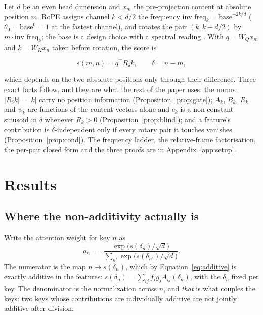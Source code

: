 \documentclass{article}
\theoremstyle{plain}
\theoremstyle{remark}
\newcommand{\R}{R}
\newcommand{\invf}{\mathrm{inv\_freq}}
\newcommand{\psik}{\psi_k}
\newcommand{\half}{d/2}
\begin{document}
Let $d$ be an even head dimension and $x_m$ the pre-projection content at
absolute position $m$. RoPE assigns channel $k < \half$ the frequency
$\invf_k = \mathrm{base}^{-2k/d}$ ($\theta_0 = \mathrm{base}^{0} = 1$ at the
fastest channel), and rotates the pair $(k, k + \half)$ by $m\cdot\invf_k$; the
base is a design choice with a spectral reading \citep{liu2026oscillator}. With
$q = W_Q x_m$ and $k = W_K x_n$ taken before rotation, the score is

\begin{equation}
  s(m,n) = q^{\!\top}\R_{\delta} k, \qquad \delta = n - m,
  \label{eq:relative}
\end{equation}

which depends on the two absolute positions only through their difference.
Three exact facts follow, and they are what the rest of the paper uses: the
norms $|\R_\delta k| = |k|$ carry no position information
(Proposition~\ref{prop:gate}); $A_k$, $B_k$, $R_k$ and $\psik$ are functions of
the content vectors alone and $c_k$ is a non-constant sinusoid in $\delta$
whenever $R_k > 0$ (Proposition~\ref{prop:blind}); and a feature's contribution
is $\delta$-independent only if every rotary pair it touches vanishes
(Proposition~\ref{prop:cond}). The frequency ladder, the relative-frame
factorisation, the per-pair closed form and the three proofs are in
Appendix~\ref{app:setup}.

\section{Results}

\subsection{Where the non-additivity actually is}
\label{sec:softmax}

Write the attention
weight for key $n$ as
\begin{equation}
  a_n \;=\; \frac{\exp\!\bigl(s(\delta_n)/\sqrt{d}\bigr)}
  {\sum_{n'} \exp\!\bigl(s(\delta_{n'})/\sqrt{d}\bigr)} .
\end{equation}
The numerator is the map $n \mapsto s(\delta_n)$, which by
Equation~\ref{eq:additive} is exactly additive in the features:
$s(\delta_n) = \sum_{ij} f_i g_j A_{ij}(\delta_n)$, with the $\delta_n$ fixed per
key. The denominator is the normalization across $n$, and \emph{that} is what
couples the keys: two keys whose contributions are individually additive are not
jointly additive after division.
\end{document}
